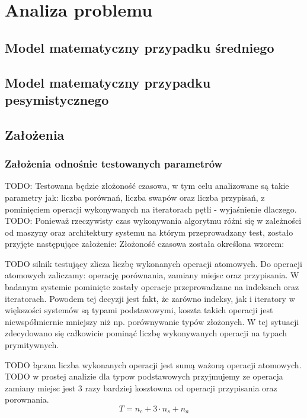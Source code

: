\chapter{Analiza problemu}

\section{Model matematyczny przypadku średniego}

\section{Model matematyczny przypadku pesymistycznego}

\section{Założenia}

\subsection{Założenia odnośnie testowanych parametrów}
TODO: Testowana będzie złożoność czasowa, w tym celu analizowane są takie parametry jak: liczba porównań,
liczba swapów oraz liczba przypisań, z pominięciem operacji wykonywanych na iteratorach pętli -
wyjaśnienie dlaczego.\\

TODO: Ponieważ rzeczywisty czas wykonywania algorytmu różni się w zależności od maszyny oraz architektury systemu
na którym przeprowadzany test, zostało przyjęte następujące założenie:
Złożoność czasowa została określona wzorem:

TODO silnik testujący zlicza liczbę wykonanych operacji atomowych. Do operacji atomowych zaliczamy: operację porównania, zamiany miejsc oraz przypisania. W badanym systemie pominięte zostały operacje przeprowadzane na indeksach oraz iteratorach. Powodem tej decyzji jest fakt, że zarówno indeksy, jak i iteratory w większości systemów są typami podstawowymi, koszta takich operacji jest niewspółmiernie mniejszy niż np. porównywanie typów złożonych. W tej sytuacji zdecydowano się całkowicie pominąć liczbę wykonywanych operacji na typach prymitywnych.

TODO łączna liczba wykonanych operacji jest sumą ważoną operacji atomowych.
TODO w prostej analizie dla typow podstawowych przyjmujemy ze operacja zamiany miejsc jest 3 razy bardziej kosztowna od operacji przypisania oraz porownania.
\boldmath$$T = n_c + 3 \cdot n_s + n_a $$

